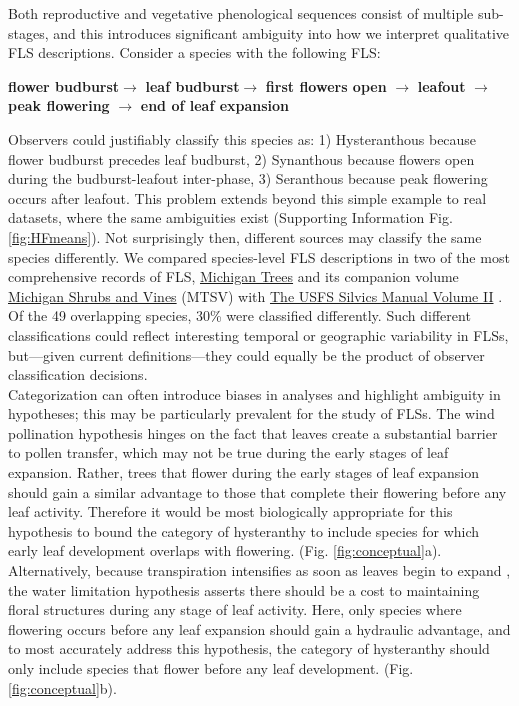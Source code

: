 \documentclass[11pt]{article}
\begin{document}
\noindent Both reproductive and vegetative phenological sequences consist of multiple sub-stages, and this introduces significant ambiguity into how we interpret qualitative FLS descriptions. Consider a species with the following FLS:\\

\begin{center}
\textbf{flower budburst}$\rightarrow$ \textbf{leaf budburst}$\rightarrow$ \textbf{first flowers open} $\rightarrow$ \textbf{leafout} $\rightarrow$ \textbf{peak flowering} $\rightarrow$ \textbf{end of leaf expansion} \\
\end{center}

\noindent Observers could justifiably classify this species as: 1) Hysteranthous because flower budburst precedes leaf budburst, 2) Synanthous because flowers open during the budburst-leafout inter-phase, 3) Seranthous because peak flowering occurs after leafout. This problem extends beyond this simple example to real datasets, \citep[e.g.][]{OKeefe2015} where the same ambiguities exist (Supporting Information Fig. \ref{fig:HFmeans}). Not surprisingly then, different sources may classify the same species differently. We compared species-level FLS descriptions in two of the most comprehensive records of FLS, \underline{Michigan Trees} and its companion volume \underline{Michigan Shrubs and Vines} (MTSV) \citep{Barnes2004,Barnes2016} with \underline{The USFS Silvics Manual Volume II} \citep{Burns1990}. Of the 49 overlapping species, 30\% were classified differently. Such different classifications could reflect interesting temporal or geographic variability in FLSs, but---given current definitions---they could equally be the product of observer classification decisions.\\

\noindent Categorization can often introduce biases in analyses \citep{Edwards2015} and highlight ambiguity in hypotheses; this may be particularly prevalent for the study of FLSs. The wind pollination hypothesis hinges on the fact that leaves create a substantial barrier to pollen transfer, which may not be true during the early stages of leaf expansion. Rather, trees that flower during the early stages of leaf expansion should gain a similar advantage to those that complete their flowering before any leaf activity. Therefore it would be most biologically appropriate for this hypothesis to bound the category of hysteranthy to include species for which early leaf development overlaps with flowering. (Fig. \ref{fig:conceptual}a). Alternatively, because transpiration intensifies as soon as leaves begin to expand \citep{%
Wang2018}, the water limitation hypothesis asserts there should be a cost to maintaining floral structures during any stage of leaf activity. Here, only species where flowering occurs before any leaf expansion should gain a hydraulic advantage, and to most accurately address this hypothesis, the category of hysteranthy should only include species that flower before any leaf development. (Fig. \ref{fig:conceptual}b).\\ 
\end{document}
